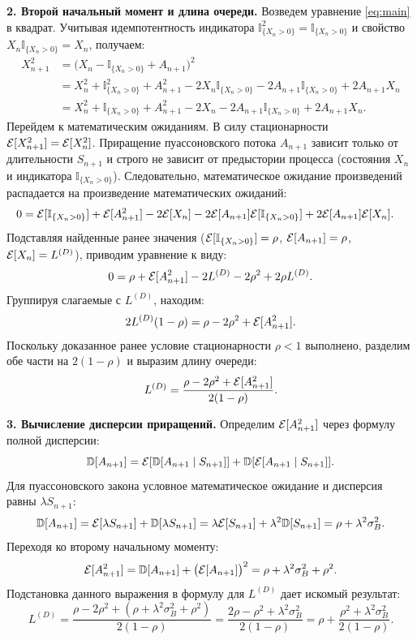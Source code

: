 \begin{tproof}
\textbf{2. Второй начальный момент и длина очереди.}
Возведем уравнение \eqref{eq:main} в квадрат. Учитывая идемпотентность индикатора $\mathbb{I}_{\{X_n > 0\}}^2 = \mathbb{I}_{\{X_n > 0\}}$ и свойство $X_n \mathbb{I}_{\{X_n > 0\}} = X_n$, получаем:
\begin{align*}
X_{n+1}^2 &= \big(X_n - \mathbb{I}_{\{X_n > 0\}} + A_{n+1}\big)^2 \\
&= X_n^2 + \mathbb{I}_{\{X_n > 0\}}^2 + A_{n+1}^2 - 2X_n\mathbb{I}_{\{X_n > 0\}} - 2A_{n+1}\mathbb{I}_{\{X_n > 0\}} + 2A_{n+1}X_n \\
&= X_n^2 + \mathbb{I}_{\{X_n > 0\}} + A_{n+1}^2 - 2X_n - 2A_{n+1}\mathbb{I}_{\{X_n > 0\}} + 2A_{n+1}X_n.
\end{align*}
Перейдем к математическим ожиданиям. В силу стационарности $\mathcal{E}[X_{n+1}^2] = \mathcal{E}[X_n^2]$. Приращение пуассоновского потока $A_{n+1}$ зависит только от длительности $S_{n+1}$ и строго не зависит от предыстории процесса (состояния $X_n$ и индикатора $\mathbb{I}_{\{X_n > 0\}}$). Следовательно, математическое ожидание произведений распадается на произведение математических ожиданий:
\begin{align*}
0 &= \mathcal{E}[\mathbb{I}_{\{X_n > 0\}}] + \mathcal{E}[A_{n+1}^2] - 2\mathcal{E}[X_n] - 2\mathcal{E}[A_{n+1}]\mathcal{E}[\mathbb{I}_{\{X_n > 0\}}] + 2\mathcal{E}[A_{n+1}]\mathcal{E}[X_n].
\end{align*}
Подставляя найденные ранее значения ($\mathcal{E}[\mathbb{I}_{\{X_n > 0\}}] = \rho$, $\mathcal{E}[A_{n+1}] = \rho$, $\mathcal{E}[X_n] = L^{(D)}$), приводим уравнение к виду:
$$
0 = \rho + \mathcal{E}[A_{n+1}^2] - 2L^{(D)} - 2\rho^2 + 2\rho L^{(D)}.
$$
Группируя слагаемые с $L^{(D)}$, находим:
$$
2L^{(D)}(1 - \rho) = \rho - 2\rho^2 + \mathcal{E}[A_{n+1}^2].
$$
Поскольку доказанное ранее условие стационарности $\rho < 1$ выполнено, разделим обе части на $2(1-\rho)$ и выразим длину очереди:
$$
L^{(D)} = \frac{\rho - 2\rho^2 + \mathcal{E}[A_{n+1}^2]}{2(1-\rho)}.
$$

\textbf{3. Вычисление дисперсии приращений.}
Определим $\mathcal{E}[A_{n+1}^2]$ через формулу полной дисперсии:
$$
\mathbb{D}[A_{n+1}] = \mathcal{E}[\mathbb{D}[A_{n+1} \mid S_{n+1}]] + \mathbb{D}[\mathcal{E}[A_{n+1} \mid S_{n+1}]].
$$
Для пуассоновского закона условное математическое ожидание и дисперсия равны $\lambda S_{n+1}$:
$$
\mathbb{D}[A_{n+1}] = \mathcal{E}[\lambda S_{n+1}] + \mathbb{D}[\lambda S_{n+1}] = \lambda \mathcal{E}[S_{n+1}] + \lambda^2 \mathbb{D}[S_{n+1}] = \rho + \lambda^2 \sigma_B^2.
$$
Переходя ко второму начальному моменту:
$$
\mathcal{E}[A_{n+1}^2] = \mathbb{D}[A_{n+1}] + \big(\mathcal{E}[A_{n+1}]\big)^2 = \rho + \lambda^2 \sigma_B^2 + \rho^2.
$$
Подстановка данного выражения в формулу для $L^{(D)}$ дает искомый результат:
$$
L^{(D)} = \frac{\rho - 2\rho^2 + (\rho + \lambda^2 \sigma_B^2 + \rho^2)}{2(1-\rho)} = \frac{2\rho - \rho^2 + \lambda^2 \sigma_B^2}{2(1-\rho)} = \rho + \frac{\rho^2 + \lambda^2 \sigma_B^2}{2(1-\rho)}.
$$


\end{tproof}
